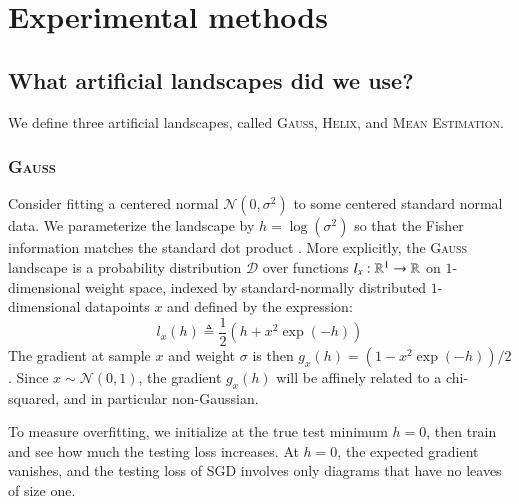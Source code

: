 \documentclass[anon,12pt]{colt2021} %
\newcommand{\wrap}[1]{\left(#1\right)}
\newcommand{\Dd}{\mathcal{D}}
\newcommand{\Nn}{\mathcal{N}}   \newcommand{\NN}{\mathbb{N}}
\newcommand{\Gauss}{\textsc{Gauss}}
\newcommand{\Helix}{\textsc{Helix}}
\newcommand{\MeanEstimation}{\textsc{Mean Estimation}}
\begin{document}

\newpage
\section{Experimental methods}\label{appendix:experiments}

    \subsection{What artificial landscapes did we use?}             \label{appendix:artificial}

        We define three artificial landscapes, called
        \Gauss, \Helix, and \MeanEstimation.

        \subsubsection{\Gauss}
            Consider fitting a centered normal $\Nn(0, \sigma^2)$ to some
            centered standard normal data.  We parameterize the landscape by
            $h=\log(\sigma^2)$ so that the Fisher information matches the
            standard dot product \citep{am98}.   
            More explicitly, the \Gauss\, landscape is a probability
            distribution $\Dd$ over functions $l_x:\mathbb{R}^1\to \mathbb{R}$ on
            $1$-dimensional weight space, indexed by standard-normally
            distributed $1$-dimensional datapoints $x$ and defined by the
            expression:
            $$
                l_x(h)
                \triangleq
                \frac{1}{2} \wrap{h + x^2 \exp(-h)}
            $$
            The gradient at sample $x$ and weight $\sigma$ is then $g_x(h) =
            (1-x^2\exp(-h))/2$.  Since $x\sim \Nn(0, 1)$, the gradient $g_x(h)$
            will be affinely related to a chi-squared, and in particular
            non-Gaussian.
            
            To measure overfitting, we initialize at the true test minimum
            $h=0$, then train and see how much the testing loss increases.  At
            $h=0$, the expected gradient vanishes, and the testing loss of SGD
            involves only diagrams that have no leaves of size one.
            
\end{document}
